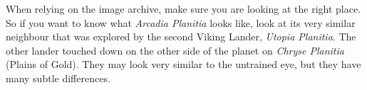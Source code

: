 When relying on the image archive, make sure you are looking at the right place. So if you want to know what {\it Arcadia Planitia} looks like, look at its very similar neighbour that was explored by the second Viking Lander, {\it Utopia Planitia}. The other lander touched down on the other side of the planet on {\it Chryse Planitia} (Plains of Gold). They may look very similar to the untrained eye, but they have many subtle differences.

